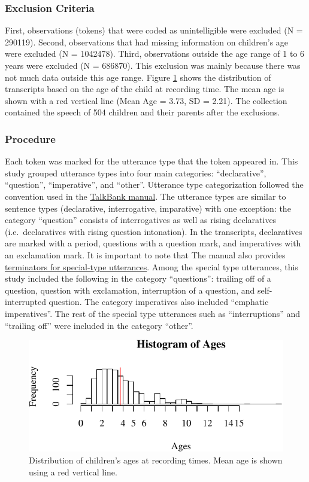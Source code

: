 \documentclass[oneside]{report}
\theoremstyle{definition}
\theoremstyle{definition}
\theoremstyle{definition}
\theoremstyle{remark}
\begin{document}
\subsubsection{Exclusion Criteria}\label{exclusion-criteria}

First, observations (tokens) that were coded as unintelligible were
excluded (N = 290119). Second, observations that had missing information
on children's age were excluded (N = 1042478). Third, observations
outside the age range of 1 to 6 years were excluded (N = 686870). This
exclusion was mainly because there was not much data outside this age
range. Figure \ref{fig:ageDistPlot} shows the distribution of
transcripts based on the age of the child at recording time. The mean
age is shown with a red vertical line (Mean Age = 3.73, SD = 2.21). The
collection contained the speech of 504 children and their parents after
the exclusions.

\subsubsection{Procedure}\label{procedure}

Each token was marked for the utterance type that the token appeared in.
This study grouped utterance types into four main categories:
``declarative'', ``question'', ``imperative'', and ``other''. Utterance
type categorization followed the convention used in the
\href{https://talkbank.org/manuals/CHAT.html\#_Toc486414422}{TalkBank
manual}. The utterance types are similar to sentence types (declarative,
interrogative, imparative) with one exception: the category ``question''
consists of interrogatives as well as rising declaratives
(i.e.~declaratives with rising question intonation). In the transcripts,
declaratives are marked with a period, questions with a question mark,
and imperatives with an exclamation mark. It is important to note that
The manual also provides
\href{https://talkbank.org/manuals/CHAT.html\#_Toc486414431}{terminators
for special-type utterances}. Among the special type utterances, this
study included the following in the category ``questions'': trailing off
of a question, question with exclamation, interruption of a question,
and self-interrupted question. The category imperatives also included
``emphatic imperatives''. The rest of the special type utterances such
as ``interruptions'' and ``trailing off'' were included in the category
``other''.
\begin{figure}
\centering
\includegraphics{figs/ageDistPlot-1.pdf}
\caption{\label{fig:ageDistPlot}Distribution of children's ages at recording
times. Mean age is shown using a red vertical line.}
\end{figure}
\end{document}
